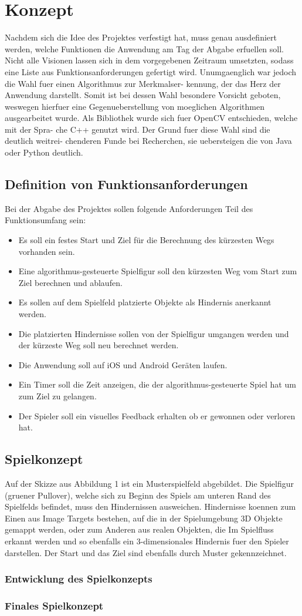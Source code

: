 \chapter{Konzept}
\label{sec:conzept}
Nachdem sich die Idee des Projektes verfestigt hat, muss genau ausdefiniert werden, welche Funktionen die Anwendung am Tag der Abgabe erfuellen soll. Nicht alle Visionen lassen sich in dem vorgegebenen Zeitraum umsetzten, sodass eine Liste aus Funktionsanforderungen gefertigt wird.
Unumgaenglich war jedoch die Wahl fuer einen Algorithmus zur Merkmalser- kennung, der das Herz der Anwendung darstellt. Somit ist bei dessen Wahl besondere Vorsicht geboten, weswegen hierfuer eine Gegenueberstellung von moeglichen Algorithmen ausgearbeitet wurde.
Als Bibliothek wurde sich fuer OpenCV entschieden, welche mit der Spra- che C++ genutzt wird. Der Grund fuer diese Wahl sind die deutlich weitrei- chenderen Funde bei Recherchen, sie uebersteigen die von Java oder Python deutlich.


\section{Definition von Funktionsanforderungen}
Bei der Abgabe des Projektes sollen folgende Anforderungen Teil des Funktionsumfang sein:
\begin{itemize}
\item Es soll ein festes Start und Ziel für die Berechnung des kürzesten Wegs vorhanden sein.
\item Eine algorithmus-gesteuerte Spielfigur soll den kürzesten Weg vom Start zum Ziel berechnen und ablaufen.
\item Es sollen auf dem Spielfeld platzierte Objekte als Hindernis anerkannt werden.
\item Die platzierten Hindernisse sollen von der Spielfigur umgangen werden und der kürzeste Weg soll neu berechnet werden.
\item Die Anwendung soll auf iOS und Android Geräten laufen.
\item Ein Timer soll die Zeit anzeigen, die der algorithmus-gesteuerte Spiel hat um zum Ziel  zu gelangen.
\item Der Spieler soll ein visuelles Feedback erhalten ob er gewonnen oder verloren hat.
\end{itemize}

\section{Spielkonzept}
Auf der Skizze aus Abbildung 1 ist ein Musterspielfeld abgebildet. Die Spielfigur (gruener Pullover), welche sich zu Beginn des Spiels am unteren Rand des Spielfelds befindet, muss den Hindernissen ausweichen. Hindernisse koennen zum Einen aus Image Targets bestehen, auf die in der Spielumgebung 3D Objekte gemappt werden, oder zum Anderen aus realen Objekten, die Im Spielfluss erkannt werden und so ebenfalls ein 3-dimensionales Hindernis fuer den Spieler darstellen. Der Start und das Ziel sind ebenfalls durch Muster gekennzeichnet.

\subsection{Entwicklung des Spielkonzepts}
\subsection{Finales Spielkonzept}